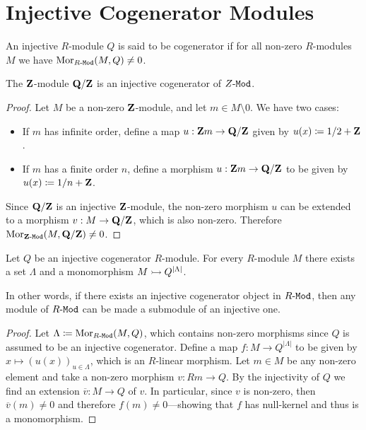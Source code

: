 
\section{Injective Cogenerator Modules}

\begin{definition}
    \label{def:injective-cogenerator}
    An injective \(R\)-module \(Q\) is said to be cogenerator if for all non-zero
    \(R\)-modules \(M\) we have \(\operatorname{Mor}_{{R\text{-}\texttt{Mod}}}(M, Q) \neq 0\).
\end{definition}

\begin{lemma}
    \label{lem:QZ-is-injective-cogenerator}
    The \(\mathbf{Z}\)-module \(\mathbf{Q}/\mathbf{Z}\) is an injective cogenerator of \({Z\text{-}\texttt{Mod}}\).
\end{lemma}

\begin{proof}
    Let \(M\) be a non-zero \(\mathbf{Z}\)-module, and let \(m \in M \setminus 0\). We have two cases:
    \begin{itemize}\setlength\itemsep{0em}
        \item If \(m\) has infinite order, define a map \(u: \mathbf{Z} m \to \mathbf{Q}/\mathbf{Z}\) given by
              \(u(x) \coloneq 1/2 + \mathbf{Z}\).
        \item If \(m\) has a finite order \(n\), define a morphism \(u: \mathbf{Z} m \to \mathbf{Q}/\mathbf{Z}\)
              to be given by \(u(x) \coloneq 1/n + \mathbf{Z}\).
    \end{itemize}
    Since \(\mathbf{Q}/\mathbf{Z}\) is an injective \(\mathbf{Z}\)-module, the non-zero morphism \(u\) can
    be extended to a morphism \(v: M \to \mathbf{Q}/\mathbf{Z}\), which is also non-zero. Therefore
    \(\operatorname{Mor}_{{\mathbf{Z}\text{-}\texttt{Mod}}}(M, \mathbf{Q}/\mathbf{Z}) \neq 0\).
\end{proof}

\begin{proposition}
    \label{prop:inj-cogenerator-product-submodules}
    Let \(Q\) be an injective cogenerator \(R\)-module. For every \(R\)-module \(M\)
    there exists a set \(\Lambda\) and a monomorphism \(M \rightarrowtail Q^{|\Lambda|}\).

    In other words, if there exists an injective cogenerator object in \({R\text{-}\texttt{Mod}}\),
    then any module of \({R\text{-}\texttt{Mod}}\) can be made a submodule of an injective one.
\end{proposition}

\begin{proof}
    Let \(\Lambda \coloneq \operatorname{Mor}_{{R\text{-}\texttt{Mod}}}(M, Q)\), which contains non-zero morphisms since
    \(Q\) is assumed to be an injective cogenerator. Define a map
    \(f: M \to Q^{|\Lambda|}\) to be given by \(x \mapsto (u(x))_{u \in \Lambda}\), which is an
    \(R\)-linear morphism. Let \(m \in M\) be any non-zero element and take a non-zero
    morphism \(v: R m \to Q\). By the injectivity of \(Q\) we find an extension
    \(\overline v: M \to Q\) of \(v\). In particular, since \(v\) is non-zero, then
    \(\overline v(m) \neq 0\) and therefore \(f(m) \neq 0\)---showing that \(f\) has
    null-kernel and thus is a monomorphism.
\end{proof}

